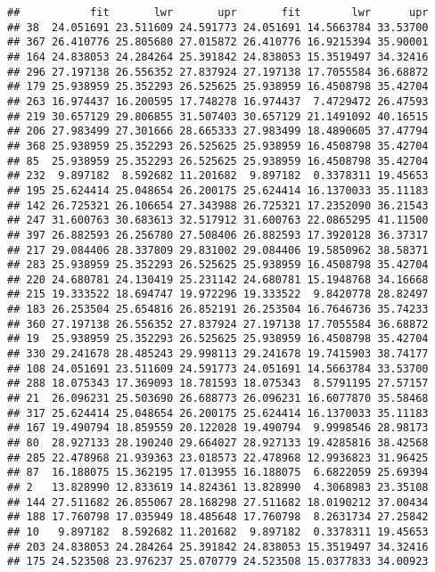 \documentclass[
]{article}
\begin{document}
\begin{verbatim}
##           fit       lwr       upr       fit        lwr      upr
## 38  24.051691 23.511609 24.591773 24.051691 14.5663784 33.53700
## 367 26.410776 25.805680 27.015872 26.410776 16.9215394 35.90001
## 164 24.838053 24.284264 25.391842 24.838053 15.3519497 34.32416
## 296 27.197138 26.556352 27.837924 27.197138 17.7055584 36.68872
## 179 25.938959 25.352293 26.525625 25.938959 16.4508798 35.42704
## 263 16.974437 16.200595 17.748278 16.974437  7.4729472 26.47593
## 219 30.657129 29.806855 31.507403 30.657129 21.1491092 40.16515
## 206 27.983499 27.301666 28.665333 27.983499 18.4890605 37.47794
## 368 25.938959 25.352293 26.525625 25.938959 16.4508798 35.42704
## 85  25.938959 25.352293 26.525625 25.938959 16.4508798 35.42704
## 232  9.897182  8.592682 11.201682  9.897182  0.3378311 19.45653
## 195 25.624414 25.048654 26.200175 25.624414 16.1370033 35.11183
## 142 26.725321 26.106654 27.343988 26.725321 17.2352090 36.21543
## 247 31.600763 30.683613 32.517912 31.600763 22.0865295 41.11500
## 397 26.882593 26.256780 27.508406 26.882593 17.3920128 36.37317
## 217 29.084406 28.337809 29.831002 29.084406 19.5850962 38.58371
## 283 25.938959 25.352293 26.525625 25.938959 16.4508798 35.42704
## 220 24.680781 24.130419 25.231142 24.680781 15.1948768 34.16668
## 215 19.333522 18.694747 19.972296 19.333522  9.8420778 28.82497
## 183 26.253504 25.654816 26.852191 26.253504 16.7646736 35.74233
## 360 27.197138 26.556352 27.837924 27.197138 17.7055584 36.68872
## 19  25.938959 25.352293 26.525625 25.938959 16.4508798 35.42704
## 330 29.241678 28.485243 29.998113 29.241678 19.7415903 38.74177
## 108 24.051691 23.511609 24.591773 24.051691 14.5663784 33.53700
## 288 18.075343 17.369093 18.781593 18.075343  8.5791195 27.57157
## 21  26.096231 25.503690 26.688773 26.096231 16.6077870 35.58468
## 317 25.624414 25.048654 26.200175 25.624414 16.1370033 35.11183
## 167 19.490794 18.859559 20.122028 19.490794  9.9998546 28.98173
## 80  28.927133 28.190240 29.664027 28.927133 19.4285816 38.42568
## 285 22.478968 21.939363 23.018573 22.478968 12.9936823 31.96425
## 87  16.188075 15.362195 17.013955 16.188075  6.6822059 25.69394
## 2   13.828990 12.833619 14.824361 13.828990  4.3068983 23.35108
## 144 27.511682 26.855067 28.168298 27.511682 18.0190212 37.00434
## 188 17.760798 17.035949 18.485648 17.760798  8.2631734 27.25842
## 10   9.897182  8.592682 11.201682  9.897182  0.3378311 19.45653
## 203 24.838053 24.284264 25.391842 24.838053 15.3519497 34.32416
## 175 24.523508 23.976237 25.070779 24.523508 15.0377833 34.00923

\end{verbatim}
\end{document}
